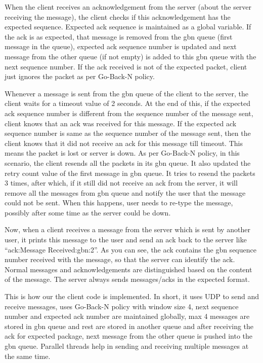 \documentclass[10pt, pdftex, twocolumn]{report}
\begin{document}
	When the client receives an acknowledgement from the server (about the server receiving the message), the client checks if this acknowledgement has the expected sequence. Expected ack sequence is maintained as a global variable. If the ack is as expected, that message is removed from the gbn queue (first message in the queue), expected ack sequence number is updated and next message from the other queue (if not empty) is added to this gbn queue with the next sequence number. If the ack received is not of the expected packet, client just ignores the packet as per Go-Back-N policy. 
	
	Whenever a message is sent from the gbn queue of the client to the server, the client waits for a timeout value of 2 seconds. At the end of this, if the expected ack sequence number is different from the sequence number of the message sent, client knows that an ack was received for this message. If the expected ack sequence number is same as the sequence number of the message sent, then the client knows that it did not receive an ack for this message till timeout. This means the packet is lost or server is down. As per Go-Back-N policy, in this scenario, the client resends all the packets in its gbn queue. It also updated the retry count value of the first message in gbn queue. It tries to resend the packets 3 times, after which, if it still did not receive an ack from the server, it will remove all the messages from gbn queue and notify the user that the message could not be sent. When this happens, user needs to re-type the message, possibly after some time as the server could be down.
	
	Now, when a client receives a message from the server which is sent by another user, it prints this message to the user and send an ack back to the server like “ack:Message Received:gbn:2”. As you can see, the ack contains the gbn sequence number received with the message, so that the server can identify the ack. Normal messages and acknowledgements are distinguished based on the content of the message. The server always sends messages/acks in the expected format.
	
	This is how our the client code is implemented. In short, it uses UDP to send and receive messages, uses Go-Back-N policy with window size 4, next sequence number and expected ack number are maintained globally, max 4 messages are stored in gbn queue and rest are stored in another queue and after receiving the ack for expected package, next message from the other queue is pushed into the gbn queue. Parallel threads help in sending and receiving multiple messages at the same time.
	
\end{document}
